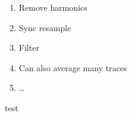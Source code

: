 \begin{enumerate}
  \item Remove harmonics
  \item Sync resample
  \item Filter
  \item Can also average many traces
  \item \ldots
\end{enumerate}

test
